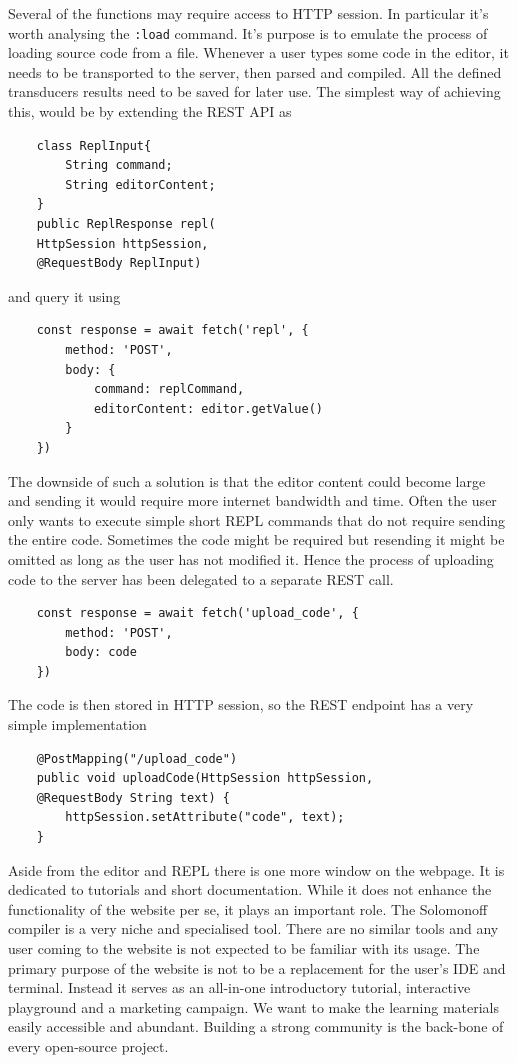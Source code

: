 Several of the functions may require access to HTTP session. In particular it's worth analysing the     \texttt{:load} command. It's purpose is to emulate the process of loading source code from a file. Whenever a user types some code in the editor, it needs to be transported to the server, then parsed and compiled. All the defined transducers results need to be saved for later use. The simplest way of achieving this, would be by extending the REST API as
\begin{lstlisting}
	class ReplInput{
		String command;
		String editorContent;
	}
	public ReplResponse repl(
	HttpSession httpSession, 
	@RequestBody ReplInput)
\end{lstlisting}
and query it using
\begin{lstlisting}
	const response = await fetch('repl', {
		method: 'POST',
		body: {
			command: replCommand,
			editorContent: editor.getValue()
		}
	})
\end{lstlisting}
The downside of such a solution is that the editor content could become large and sending it would require more internet bandwidth and time. Often the user only wants to execute simple short REPL commands that do not require sending the entire code. Sometimes the code might be required but resending it might be omitted as long as the user has not modified it. Hence the process of uploading code to the server has been delegated to a separate REST call.
\begin{lstlisting}
	const response = await fetch('upload_code', {
		method: 'POST',
		body: code
	})
\end{lstlisting}
The code is then stored in HTTP session, so the REST endpoint has a very simple implementation
\begin{lstlisting}
	@PostMapping("/upload_code")
	public void uploadCode(HttpSession httpSession, 
	@RequestBody String text) {
		httpSession.setAttribute("code", text);
	}
\end{lstlisting}


Aside from the editor and REPL there is one more window on the webpage. It is dedicated to tutorials and short documentation.  While it does not enhance the functionality of the website per se, it plays an important role. The Solomonoff compiler is a very niche and specialised tool. There are no similar tools and any user coming to the website is not expected to be familiar with its usage. The primary purpose of the website is not to be a replacement for the user's IDE and terminal. Instead it serves as an all-in-one introductory tutorial, interactive playground and a marketing campaign. We want to make the learning materials easily accessible and abundant. Building a strong community is the back-bone of every open-source project. 

